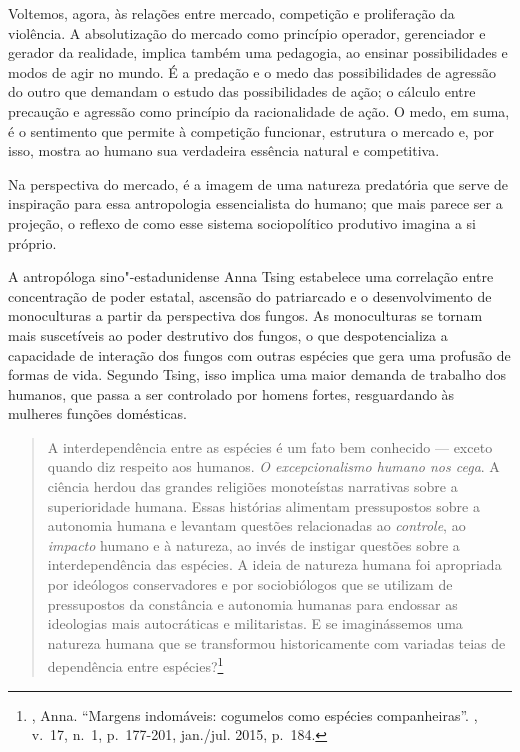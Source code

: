 \asterisc

Voltemos, agora, às relações entre mercado, competição e proliferação da violência.
A absolutização do mercado como princípio operador, gerenciador e
gerador da realidade, implica também uma pedagogia, ao ensinar
possibilidades e modos de agir no mundo. É a predação e o medo das
possibilidades de agressão do outro que demandam o estudo das
possibilidades de ação; o cálculo entre precaução e agressão como
princípio da racionalidade de ação. O medo, em suma, é o sentimento que
permite à competição funcionar, estrutura o mercado e, por isso, mostra ao humano
sua verdadeira essência natural e competitiva.

Na perspectiva do mercado, é a imagem de uma natureza
predatória que serve de inspiração para essa antropologia essencialista
do humano; que mais parece ser a projeção, o reflexo de como esse
sistema sociopolítico produtivo imagina a si próprio.

A antropóloga sino"-estadunidense Anna Tsing estabelece uma correlação entre
concentração de poder estatal, ascensão do patriarcado e o
desenvolvimento de monoculturas a partir da perspectiva dos fungos. As
monoculturas se tornam mais suscetíveis ao poder destrutivo dos fungos,
o que despotencializa a capacidade de interação dos fungos com outras
espécies que gera uma profusão de formas de vida. Segundo Tsing, isso
implica uma maior demanda de trabalho dos humanos, que passa a ser
controlado por homens fortes, resguardando às mulheres funções
domésticas.

\begin{quote}
A interdependência entre as espécies é um fato bem conhecido --- exceto
quando diz respeito aos humanos. \emph{O excepcionalismo humano nos
cega}. A ciência herdou das grandes religiões monoteístas narrativas
sobre a superioridade humana. Essas histórias alimentam pressupostos
sobre a autonomia humana e levantam questões relacionadas ao
\emph{controle}, ao \emph{impacto} humano e à natureza, ao invés de
instigar questões sobre a interdependência das espécies. A ideia de
natureza humana foi apropriada por ideólogos conservadores e por
sociobiólogos que se utilizam de pressupostos da constância e autonomia
humanas para endossar as ideologias mais autocráticas e militaristas. E
se imaginássemos uma natureza humana que se transformou historicamente
com variadas teias de dependência entre espécies?\footnote{,
  Anna. ``Margens indomáveis: cogumelos como espécies companheiras''. {}, v.~17, n.~1, p.~177-201, jan./jul. 2015, p.~184.}
\end{quote}

